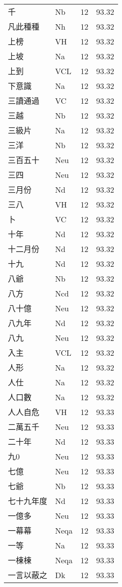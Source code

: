 \documentclass[twocolumn]{book}
\begin{document}
\begin{supertabular}{llrr}
千 & Nb & 12 &  93.32\\
凡此種種 & Nh & 12 &  93.32\\
上榜 & VH & 12 &  93.32\\
上坡 & Na & 12 &  93.32\\
上到 & VCL & 12 &  93.32\\
下意識 & Na & 12 &  93.32\\
三讀通過 & VC & 12 &  93.32\\
三越 & Nb & 12 &  93.32\\
三級片 & Na & 12 &  93.32\\
三洋 & Nb & 12 &  93.32\\
三百五十 & Neu & 12 &  93.32\\
三四 & Neu & 12 &  93.32\\
三月份 & Nd & 12 &  93.32\\
三八 & VH & 12 &  93.32\\
卜 & VC & 12 &  93.32\\
十年 & Nd & 12 &  93.32\\
十二月份 & Nd & 12 &  93.32\\
十九 & Nd & 12 &  93.32\\
八爺 & Nb & 12 &  93.32\\
八方 & Ncd & 12 &  93.32\\
八十億 & Neu & 12 &  93.32\\
八九年 & Nd & 12 &  93.32\\
八九 & Neu & 12 &  93.32\\
入主 & VCL & 12 &  93.32\\
人形 & Na & 12 &  93.32\\
人仕 & Na & 12 &  93.32\\
人口數 & Na & 12 &  93.32\\
人人自危 & VH & 12 &  93.33\\
二萬五千 & Neu & 12 &  93.33\\
二十年 & Nd & 12 &  93.33\\
九0 & Neu & 12 &  93.33\\
七億 & Neu & 12 &  93.33\\
七爺 & Nb & 12 &  93.33\\
七十九年度 & Nd & 12 &  93.33\\
一億多 & Neu & 12 &  93.33\\
一幕幕 & Neqa & 12 &  93.33\\
一等 & Na & 12 &  93.33\\
一棟棟 & Neqa & 12 &  93.33\\
一言以蔽之 & Dk & 12 &  93.33\\

\end{supertabular}
\end{document}
